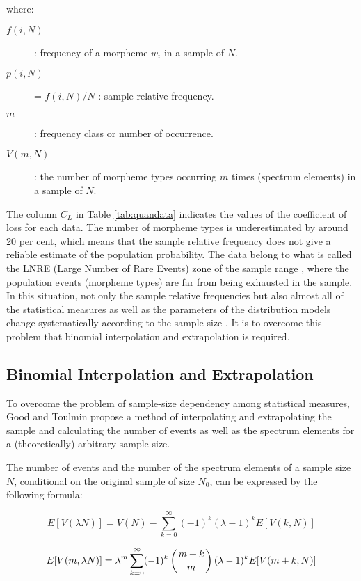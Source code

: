 \noindent
where:

\begin{description}
\item[$f(i,N)$] : frequency of a morpheme $w_i$ in a sample of $N$.
\item[$p(i,N)$] = $f(i,N)/N$ : sample relative frequency.
\item[$m$] : frequency class or number of occurrence.
\item[$V(m,N)$] : the number of morpheme types occurring $m$ times (spectrum
elements) in a sample of $N$.
\end{description}

The column $C_L$ in Table \ref{tab:quandata} indicates the values of the coefficient
of loss for each data. The number of morpheme types is underestimated by
around 20 per cent, which means that the sample relative frequency does not give a
reliable estimate of the population probability. The data belong to what is
called the LNRE (Large Number of Rare Events) zone of the sample range
\cite{chita93,khma87}, where the population events (morpheme types) are far
from being exhausted in the sample. In this situation, not only the sample
relative frequencies but also almost all of the statistical measures as well
as the parameters of the distribution models change systematically
according to the sample size \cite{baayen01,tweedie98}. It is to overcome
this problem that binomial interpolation and extrapolation is
required.


\subsection{Binomial Interpolation and Extrapolation}

To overcome the problem of sample-size dependency among statistical
measures, Good and Toulmin \cite{good56} propose a method of interpolating
and extrapolating the sample and calculating the number of events as well
as the spectrum elements for a (theoretically) arbitrary sample size.

The number of events and the number of the spectrum elements of a sample size $N$,
conditional on the original sample of size $N_0$, can be expressed by the
following formula:
 
\begin{equation}
E[V(\lambda N)] = V(N) - \sum_{k = 0}^\infty (-1)^k (\lambda -1)^k E[V(k,N)]
\end{equation}

\begin{equation}
E[V(m,\lambda N)] = \lambda^m \sum_{k = 0}^\infty (-1)^k \left (
{{m+k} \atop m} \right ) (\lambda -1)^k E[V(m+k,N)]
\end{equation}

